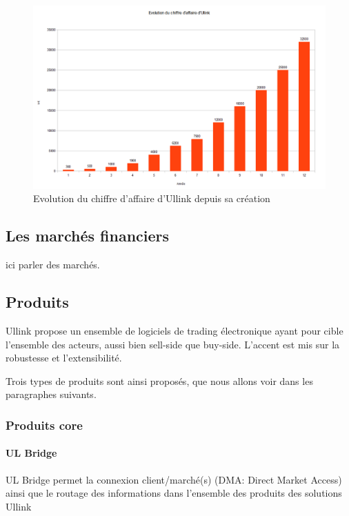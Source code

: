 \documentclass[a4paper, 12pt]{article}
\begin{document}
\begin{figure}[!h]
\includegraphics[width=\textwidth]{ca_ullink.png}
\caption{Evolution du chiffre d'affaire d'Ullink depuis sa création}
\label{ca_ullink}
\end{figure}

\subsection{Les marchés financiers}

ici parler des marchés.

\subsection{Produits}

Ullink propose un ensemble de logiciels de trading électronique ayant pour cible l'ensemble des acteurs, aussi bien sell-side que buy-side. L'accent est mis sur la robustesse et l'extensibilité.

Trois types de produits sont ainsi proposés, que nous allons voir dans les paragraphes suivants.

\subsubsection{Produits core}

\paragraph{UL Bridge}

UL Bridge permet la connexion client/marché(s) (DMA: Direct Market Access) ainsi que le routage des informations dans l'ensemble des produits des solutions Ullink
\end{document}
